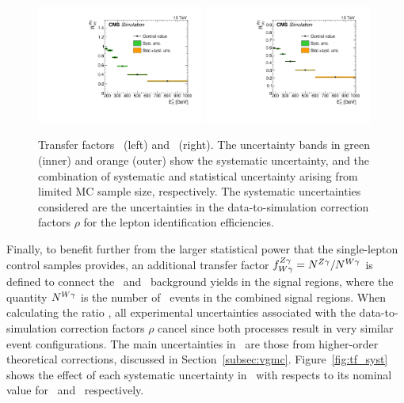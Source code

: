 \begin{figure}[htbp]
  \centering
    \includegraphics[width=0.49\textwidth]{Analysis/Figures/RWe.pdf}
    \includegraphics[width=0.49\textwidth]{Analysis/Figures/RWm.pdf}
    \caption{
      Transfer factors \RWe\ (left) and \RWm\ (right). 
      The uncertainty bands in green (inner) and orange (outer) show the systematic uncertainty, and the combination of systematic and statistical uncertainty arising from limited MC sample size, respectively. 
      The systematic uncertainties considered are the uncertainties in the data-to-simulation correction factors $\rho$ for the lepton identification efficiencies.
    }
    \label{fig:tf_w}
\end{figure}

Finally, to benefit further from the larger statistical power that the single-lepton control samples provides, an additional transfer factor $f^{{Z}\gamma}_{{W}\gamma} = N^{{Z}\gamma}_{} / N^{{W}\gamma}_{}$ is defined to connect the \zinvg\ and \wlng\ background yields in the signal regions, where the quantity $N^{{W}\gamma}_{}$ is the number of \wlng\ events in the combined signal regions. 
When calculating the ratio \fZW, all experimental uncertainties associated with the data-to-simulation correction factors $\rho$ cancel since both processes result in very similar event configurations. 
The main uncertainties in \fZW\ are those from higher-order theoretical corrections, discussed in Section~\ref{subsec:vgmc}. Figure~\ref{fig:tf_syst} shows the effect of each systematic uncertainty in \fZW\ with respects to its nominal value for \zinvg\ and \wlng\ respectively.

